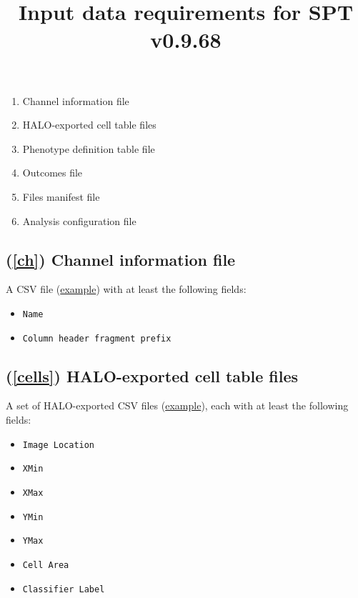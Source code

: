 \documentclass[14pt]{article}
\begin{document}
\title{Input data requirements for SPT v0.9.68}
\author{}
\maketitle

\begin{enumerate}
  \itemsep0em
  \item{\label{ch}Channel information file}
  \item{\label{cells}HALO-exported cell table files}
  \item{\label{pheno}Phenotype definition table file}
  \item{\label{outcomes}Outcomes file}
  \item{\label{files}Files manifest file}
  \item{\label{run}Analysis configuration file}
\end{enumerate}

\subsection*{(\ref{ch}) Channel information file}
A CSV file (\href{https://github.com/nadeemlab/SPT/blob/main/tests/data/elementary_phenotypes.csv}{example})
 with at least the following fields:

\begin{itemize}
  \itemsep0em
  \item[]{\colorbox{yellow!25}{\texttt{Name}}}
  \item[]{\colorbox{yellow!25}{\texttt{Column header fragment prefix}}}
\end{itemize}

\subsection*{(\ref{cells}) HALO-exported cell table files} A set of HALO-exported CSV files (\href{https://github.com/nadeemlab/SPT/blob/main/tests/data/2779f21192cb0ce1479b2bf7fb20ebba.csv}{example}), each with at least the following fields:

\begin{itemize}
  \itemsep0em
  \item[]{\colorbox{yellow!25}{\texttt{Image Location}}}
  \item[]{\colorbox{yellow!25}{\texttt{XMin}}}
  \item[]{\colorbox{yellow!25}{\texttt{XMax}}}
  \item[]{\colorbox{yellow!25}{\texttt{YMin}}}
  \item[]{\colorbox{yellow!25}{\texttt{YMax}}}
  \item[]{\colorbox{yellow!25}{\texttt{Cell Area}}}
  \item[]{\colorbox{yellow!25}{\texttt{Classifier Label}}}
\end{itemize}
\end{document}

